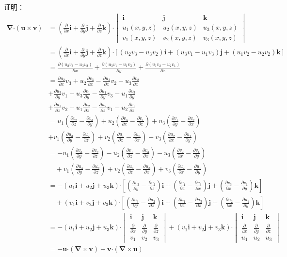 \documentclass[12pt,UTF8]{ctexart}
\newcommand{\pp}[2]{\frac{\partial #1}{\partial #2}}
\begin{document}
\begin{enumerate}
证明：\[\begin{split}
\bm\nabla\bm\cdot(\bm u\times\bm v)&=(\pp{}x\bm i+\pp{}y\bm j+\pp{}z\bm k)\bm\cdot\begin{vmatrix}
\bm i&\bm j&\bm k\\
u_1(x,y,z)&u_2(x,y,z)&u_3(x,y,z)\\
v_1(x,y,z)&v_2(x,y,z)&v_3(x,y,z)
\end{vmatrix}\\
&=(\pp{}x\bm i+\pp{}y\bm j+\pp{}z\bm k)\bm\cdot[(u_2v_3-u_3v_2)\bm i+(u_3v_1-u_1v_3)\bm j+(u_1v_2-u_2v_2)\bm k]\\
&=\pp{(u_2v_3-u_3v_2)}x+\pp{(u_3v_1-u_1v_3)}y+\pp{(u_1v_2-u_2v_1)}z\\
&=\pp{u_2}xv_3+u_2\pp{v_3}x-\pp{u_3}xv_2-u_3\pp{v_2}x\\
&+\pp{u_3}yv_1+u_3\pp{v_1}y-\pp{u_1}yv_3-u_1\pp{v_3}y\\
&+\pp{u_1}zv_2+u_1\pp{v_2}z-\pp{u_2}zv_1-u_2\pp{v_1}z\\
&=u_1(\pp{v_2}z-\pp{v_3}y)+u_2(\pp{v_3}x-\pp{v_1}z)+u_3(\pp{v_1}y-\pp{v_2}x)\\
&+v_1(\pp{u_3}y-\pp{u_2}z)+v_2(\pp{u_1}z-\pp{u_3}x)+v_3(\pp{u_2}x-\pp{u_1}y)\\
&=-u_1(\pp{v_3}y-\pp{v_2}z)-u_2(\pp{v_1}z-\pp{v_3}x)-u_3(\pp{v_2}x-\pp{v_1}y)\\
&\quad+v_1(\pp{u_3}y-\pp{u_2}z)+v_2(\pp{u_1}z-\pp{u_3}x)+v_3(\pp{u_2}x-\pp{u_1}y)\\
&=-(u_1\bm i+u_2\bm j+u_3\bm k)\bm\cdot[(\pp{v_3}y-\pp{v_2}z)\bm i+(\pp{v_1}z-\pp{v_3}x)\bm j+(\pp{v_3}x-\pp{v_1}y)\bm k]\\
&\quad+(v_1\bm i+v_2\bm j+v_3\bm k)\bm\cdot[(\pp{u_3}y-\pp{u_2}z)\bm i+(\pp{u_1}z-\pp{u_3}x)\bm j+(\pp{u_2}x-\pp{u_1}y)\bm k]\\
&=-(u_1\bm i+u_2\bm j+u_3\bm k)\bm\cdot\begin{vmatrix}
\bm i&\bm j&\bm k\\
\pp{}x&\pp{}y&\pp{}z\\
v_1&v_2&v_3
\end{vmatrix}+(v_1\bm i+v_2\bm j+v_3\bm k)\bm\cdot\begin{vmatrix}
\bm i&\bm j&\bm k\\
\pp{}x&\pp{}y&\pp{}z\\
u_1&u_2&u_3
\end{vmatrix}\\
&=-\bm u\bm\cdot(\bm\nabla\times\bm v)+\bm v\bm\cdot(\bm\nabla\times\bm u)
\end{split}\]

\end{enumerate}
\end{document}
